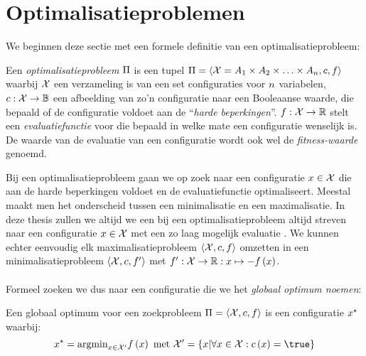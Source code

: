 \section{Optimalisatieproblemen}

We beginnen deze sectie met een formele definitie van een optimalisatieprobleem:

\begin{definition}
Een \emph{optimalisatieprobleem} $\Pi$ is een tupel $\Pi=\left\langle \mathcal{X}=A_1\times A_2\times\ldots\times A_{n},c,f\right\rangle$ waarbij $\mathcal{X}$ een verzameling is van een set configuraties voor $n$ variabelen, $c:\mathcal{X}\rightarrow \mathbb{B}$ een afbeelding van zo'n configuratie naar een Booleaanse waarde, die bepaald of de configuratie voldoet aan de ``\emph{harde beperkingen}''. $f:\mathcal{X}\rightarrow \mathbb{R}$ stelt een \emph{evaluatiefunctie} voor die bepaald in welke mate een configuratie wenselijk is. De waarde van de evaluatie van een configuratie  wordt ook wel de \emph{fitness-waarde} genoemd.
\end{definition}
Bij een optimalisatieprobleem gaan we op zoek naar een configuratie $x\in\mathcal{X}$ die aan de harde beperkingen voldoet en de evaluatiefunctie optimaliseert. Meestal maakt men het onderscheid tussen een minimalisatie en een maximalisatie. In deze thesis zullen we altijd we een bij een optimalisatieprobleem altijd streven naar een configuratie $x\in\mathcal{X}$ met een zo laag mogelijk evaluatie . We kunnen echter eenvoudig elk maximalisatieprobleem $\left\langle \mathcal{X},c,f\right\rangle$ omzetten in een minimalisatieprobleem $\left\langle \mathcal{X},c,f'\right\rangle$ met $f':\mathcal{X}\rightarrow \mathbb{R}:x\mapsto -f\left(x\right)$.

\paragraph{}
Formeel zoeken we dus naar een configuratie \xstar{} die we het \emph{globaal optimum noemen}:

\begin{definition}
Een globaal optimum voor een zoekprobleem $\Pi=\left\langle \mathcal{X},c,f\right\rangle$ is een configuratie $x^{\star}$ waarbij:
\begin{equation}
\bestSol=\displaystyle\argmin_{\sol\in\ConfigValSet}\fun{\evalfun}{\sol}\mbox{ met }\ConfigValSet=\accl{\sol|\forall\sol\in\ConfigSet:\fun{\hcfun}{\sol}=\true}
\end{equation}
\end{definition}

